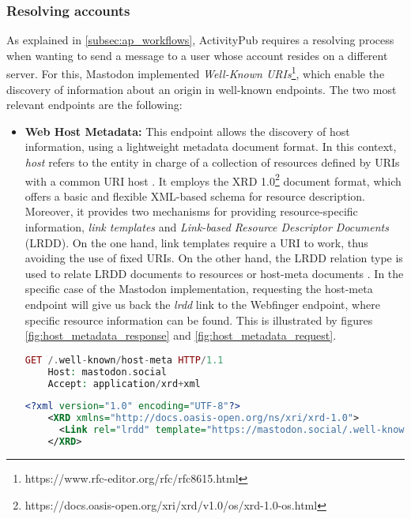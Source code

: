 \subsubsection{Resolving accounts}
As explained in \ref{subsec:ap_workflows}, ActivityPub requires a resolving process when wanting to send a message to a user whose account resides on a different server. For this, Mastodon implemented \emph{Well-Known URIs}\footnote{https://www.rfc-editor.org/rfc/rfc8615.html}, which enable the discovery of information about an origin in well-known endpoints\cite{nottingham_2019}. The two most relevant endpoints are the following: 

\begin{itemize}
  \item \textbf{Web Host Metadata: }
    This endpoint allows the discovery of host information, using a lightweight metadata document format. In this context, \emph{host} refers to the entity in charge of a collection of resources defined by URIs with a common URI host \cite{cook_2011}. It employs the XRD 1.0\footnote{https://docs.oasis-open.org/xri/xrd/v1.0/os/xrd-1.0-os.html} document format, which offers a basic and flexible XML-based schema for resource description. Moreover, it provides two mechanisms for providing resource-specific information, \emph{link templates} and \emph{Link-based Resource Descriptor Documents} (LRDD). On the one hand, link templates require a URI to work, thus avoiding the use of fixed URIs. On the other hand, the LRDD relation type is used to relate LRDD documents to resources or host-meta documents \cite{cook_2011}. In the specific case of the Mastodon implementation, requesting the host-meta endpoint will give us back the \emph{lrdd} link to the Webfinger endpoint, where specific resource information can be found. This is illustrated by figures \ref{fig:host_metadata_response} and \ref{fig:host_metadata_request}.

\lstset{style=JSONStyle}
\begin{lstlisting}[language=PHP, caption=Example Host Metadata request to mastodon.social, label=fig:host_metadata_request, float=ht]
    GET /.well-known/host-meta HTTP/1.1
    Host: mastodon.social
    Accept: application/xrd+xml
\end{lstlisting}

\lstset{style=JSONStyle}
\begin{lstlisting}[language=XML, caption=Example Host metadata response from mastodon.social, label=fig:host_metadata_response, float=h!]
    <?xml version="1.0" encoding="UTF-8"?>
    <XRD xmlns="http://docs.oasis-open.org/ns/xri/xrd-1.0">
      <Link rel="lrdd" template="https://mastodon.social/.well-known/webfinger?resource={uri}"/>
    </XRD>
\end{lstlisting}


\end{itemize}
